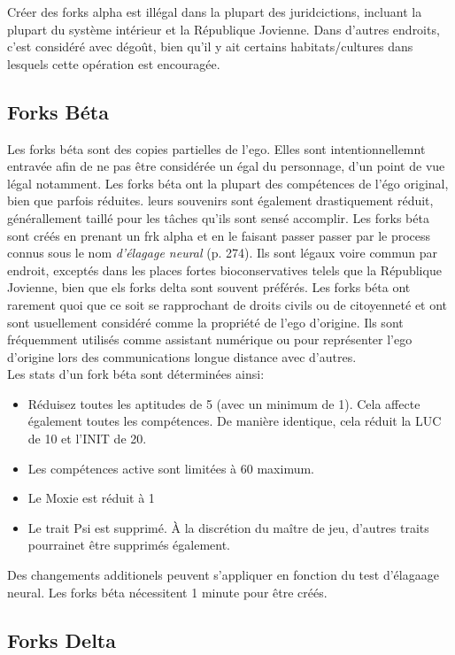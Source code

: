 Créer des forks alpha est illégal dans la plupart des juridcictions, incluant la plupart du système intérieur et la République Jovienne. Dans d'autres endroits, c'est considéré avec dégoût, bien qu'il y ait certains habitats/cultures dans lesquels cette opération est encouragée. 

\subsection{Forks Béta} 

Les forks béta sont des copies partielles de l'ego. Elles sont intentionnellemnt entravée afin de ne pas être considérée un égal du personnage, d'un point de vue légal notamment. Les forks béta ont la plupart des compétences de l'égo original, bien que parfois réduites. leurs souvenirs sont également drastiquement réduit, générallement taillé pour les tâches qu'ils sont sensé accomplir. Les forks béta sont créés en prenant un frk alpha et en le faisant passer passer par le process connus sous le nom \textit{d'élagage neural} (p. 274). Ils sont légaux voire commun par endroit, exceptés dans les places fortes bioconservatives telels que la République Jovienne, bien que els forks delta sont souvent préférés. Les forks béta ont rarement quoi que ce soit se rapprochant de droits civils ou de citoyenneté et ont sont usuellement considéré comme la propriété de l'ego d'origine. Ils sont fréquemment utilisés comme assistant numérique ou pour représenter l'ego d'origine lors des communications longue distance avec d'autres. \\ Les stats d'un fork béta sont déterminées ainsi: 

\begin{itemize} \item Réduisez toutes les aptitudes de 5 (avec un minimum de 1). Cela affecte également toutes les compétences. De manière identique, cela réduit la LUC de 10 et l'INIT de 20. \item Les compétences active sont limitées à 60 maximum. \item Le Moxie est réduit à 1 \item Le trait Psi est supprimé. À la discrétion du maître de jeu, d'autres traits pourrainet être supprimés également. \end{itemize} 

Des changements additionels peuvent s'appliquer en fonction du test d'élagaage neural. Les forks béta nécessitent 1 minute pour être créés. 

\subsection{Forks Delta} 

